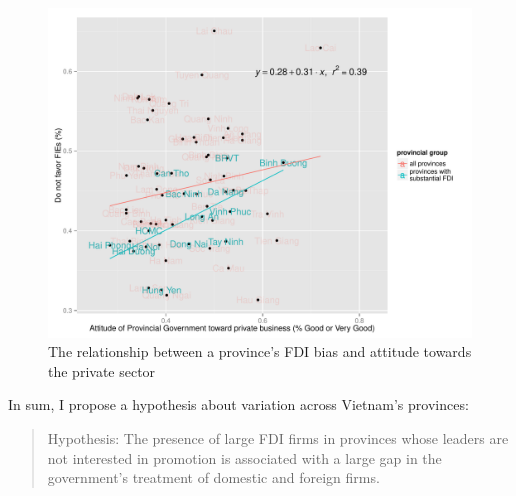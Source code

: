\begin{figure}[!ht]
\includegraphics[width=\textwidth, height=\textheight,keepaspectratio]{../figure/FDI_bias}
\caption{The relationship between a province's FDI bias and attitude towards the private sector}
\label{fig:fdi_bias_vietnam}
\end{figure}

In sum, I propose a hypothesis about variation across Vietnam's provinces:

\begin{quote}
Hypothesis: The presence of large FDI firms in provinces whose leaders are not interested in promotion is associated with a large gap in the government's treatment of domestic and foreign firms.
\end{quote}
